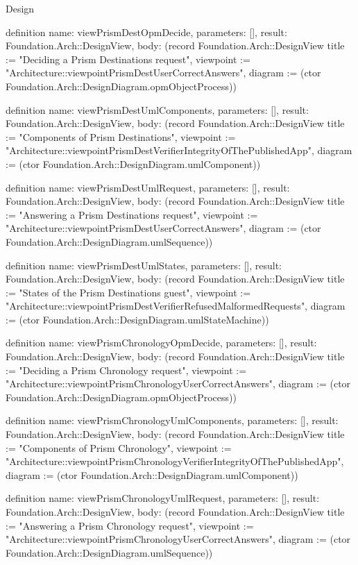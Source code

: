 \begin{lexlean}{Design}
\begin{semanticmodule}
definition{
  name: viewPrismDestOpmDecide,
  parameters: [],
  result: Foundation.Arch::DesignView,
  body: (record Foundation.Arch::DesignView {title := "Deciding a Prism Destinations request", viewpoint := "Architecture::viewpointPrismDestUserCorrectAnswers", diagram := (ctor Foundation.Arch::DesignDiagram.opmObjectProcess)})
}

definition{
  name: viewPrismDestUmlComponents,
  parameters: [],
  result: Foundation.Arch::DesignView,
  body: (record Foundation.Arch::DesignView {title := "Components of Prism Destinations", viewpoint := "Architecture::viewpointPrismDestVerifierIntegrityOfThePublishedApp", diagram := (ctor Foundation.Arch::DesignDiagram.umlComponent)})
}

definition{
  name: viewPrismDestUmlRequest,
  parameters: [],
  result: Foundation.Arch::DesignView,
  body: (record Foundation.Arch::DesignView {title := "Answering a Prism Destinations request", viewpoint := "Architecture::viewpointPrismDestUserCorrectAnswers", diagram := (ctor Foundation.Arch::DesignDiagram.umlSequence)})
}

definition{
  name: viewPrismDestUmlStates,
  parameters: [],
  result: Foundation.Arch::DesignView,
  body: (record Foundation.Arch::DesignView {title := "States of the Prism Destinations guest", viewpoint := "Architecture::viewpointPrismDestVerifierRefusedMalformedRequests", diagram := (ctor Foundation.Arch::DesignDiagram.umlStateMachine)})
}

definition{
  name: viewPrismChronologyOpmDecide,
  parameters: [],
  result: Foundation.Arch::DesignView,
  body: (record Foundation.Arch::DesignView {title := "Deciding a Prism Chronology request", viewpoint := "Architecture::viewpointPrismChronologyUserCorrectAnswers", diagram := (ctor Foundation.Arch::DesignDiagram.opmObjectProcess)})
}

definition{
  name: viewPrismChronologyUmlComponents,
  parameters: [],
  result: Foundation.Arch::DesignView,
  body: (record Foundation.Arch::DesignView {title := "Components of Prism Chronology", viewpoint := "Architecture::viewpointPrismChronologyVerifierIntegrityOfThePublishedApp", diagram := (ctor Foundation.Arch::DesignDiagram.umlComponent)})
}

definition{
  name: viewPrismChronologyUmlRequest,
  parameters: [],
  result: Foundation.Arch::DesignView,
  body: (record Foundation.Arch::DesignView {title := "Answering a Prism Chronology request", viewpoint := "Architecture::viewpointPrismChronologyUserCorrectAnswers", diagram := (ctor Foundation.Arch::DesignDiagram.umlSequence)})
}


\end{semanticmodule}
\end{lexlean}
